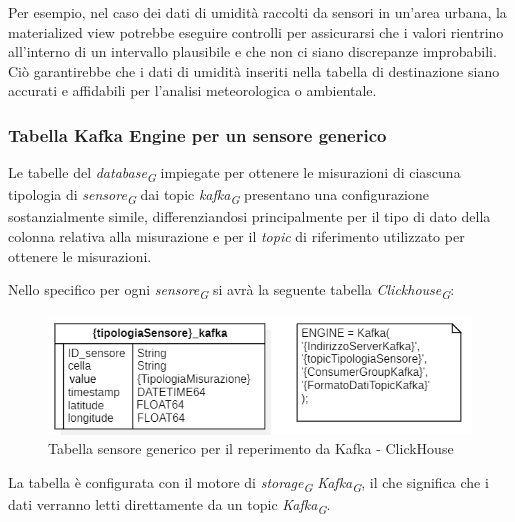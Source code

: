 Per esempio, nel caso dei dati di umidità raccolti da sensori in un'area urbana, la materialized view potrebbe eseguire controlli per assicurarsi che i valori rientrino all'interno di un intervallo plausibile e che non ci siano discrepanze improbabili. Ciò garantirebbe che i dati di umidità inseriti nella tabella di destinazione siano accurati e affidabili per l'analisi meteorologica o ambientale.

\subsubsection{Tabella Kafka Engine per un sensore generico}
Le tabelle del \textit{database}\textsubscript{\textit{G}} impiegate per ottenere le misurazioni di ciascuna tipologia di \textit{sensore}\textsubscript{\textit{G}} dai topic \textit{kafka}\textsubscript{\textit{G}} presentano una configurazione sostanzialmente simile, differenziandosi principalmente per il tipo di dato della colonna relativa alla misurazione e per il \textit{topic} di riferimento utilizzato per ottenere le misurazioni.

Nello specifico per ogni \textit{sensore}\textsubscript{\textit{G}} si avrà la seguente tabella \textit{Clickhouse}\textsubscript{\textit{G}}:
\begin{figure}[H]
    \centering
    \includegraphics[width=.6\textwidth]{../Images/SpecificaTecnica/sensorType_kafka.PNG}
    \caption{Tabella sensore generico per il reperimento da Kafka - ClickHouse}
    \label{fig:Reperimento_kafka_clickhouse}
  \end{figure}

La tabella è configurata con il motore di \textit{storage}\textsubscript{\textit{G}} \textit{Kafka}\textsubscript{\textit{G}}, il che significa che i dati verranno letti direttamente da un topic \textit{Kafka}\textsubscript{\textit{G}}. 


